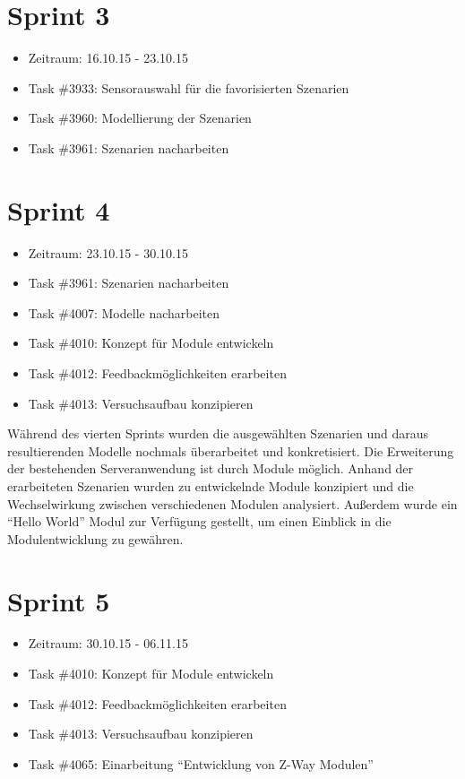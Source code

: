 \documentclass[12pt, oneside, smallheadings]{scrbook}
\begin{document}
\section{Sprint 3}
\begin{itemize}
	\item Zeitraum: 16.10.15 - 23.10.15
	\item Task \#3933: Sensorauswahl für die favorisierten Szenarien
	\item Task \#3960: Modellierung der Szenarien
	\item Task \#3961: Szenarien nacharbeiten
\end{itemize}

\section{Sprint 4}
\begin{itemize}
	\item Zeitraum: 23.10.15 - 30.10.15
	\item Task \#3961: Szenarien nacharbeiten
	\item Task \#4007: Modelle nacharbeiten
	\item Task \#4010: Konzept für Module entwickeln
	\item Task \#4012: Feedbackmöglichkeiten erarbeiten
	\item Task \#4013: Versuchsaufbau konzipieren
\end{itemize}

Während des vierten Sprints wurden die ausgewählten Szenarien und daraus resultierenden Modelle nochmals überarbeitet und konkretisiert. 
Die Erweiterung der bestehenden Serveranwendung ist durch Module möglich. Anhand der erarbeiteten Szenarien wurden zu entwickelnde Module konzipiert und die Wechselwirkung zwischen verschiedenen Modulen analysiert. Außerdem wurde ein "`Hello World"' Modul zur Verfügung gestellt, um einen Einblick in die Modulentwicklung zu gewähren.

\section{Sprint 5}
\begin{itemize}
	\item Zeitraum: 30.10.15 - 06.11.15
	\item Task \#4010: Konzept für Module entwickeln
	\item Task \#4012: Feedbackmöglichkeiten erarbeiten
	\item Task \#4013: Versuchsaufbau konzipieren
	\item Task \#4065: Einarbeitung "`Entwicklung von Z-Way Modulen"'
\end{itemize}
\end{document}
